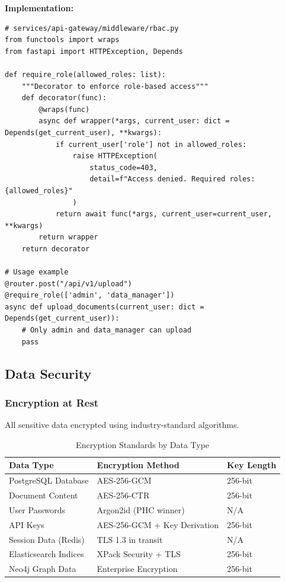 \textbf{Implementation:}
\begin{lstlisting}[style=pythonstyle]
# services/api-gateway/middleware/rbac.py
from functools import wraps
from fastapi import HTTPException, Depends

def require_role(allowed_roles: list):
    """Decorator to enforce role-based access"""
    def decorator(func):
        @wraps(func)
        async def wrapper(*args, current_user: dict = Depends(get_current_user), **kwargs):
            if current_user['role'] not in allowed_roles:
                raise HTTPException(
                    status_code=403,
                    detail=f"Access denied. Required roles: {allowed_roles}"
                )
            return await func(*args, current_user=current_user, **kwargs)
        return wrapper
    return decorator

# Usage example
@router.post("/api/v1/upload")
@require_role(['admin', 'data_manager'])
async def upload_documents(current_user: dict = Depends(get_current_user)):
    # Only admin and data_manager can upload
    pass
\end{lstlisting}

\subsection{Data Security}

\subsubsection{Encryption at Rest}

All sensitive data encrypted using industry-standard algorithms.

\begin{table}[h]
\centering
\caption{Encryption Standards by Data Type}
\begin{tabularx}{\textwidth}{lXl}
\toprule
\textbf{Data Type} & \textbf{Encryption Method} & \textbf{Key Length} \\
\midrule
PostgreSQL Database & AES-256-GCM & 256-bit \\
Document Content & AES-256-CTR & 256-bit \\
User Passwords & Argon2id (PHC winner) & N/A \\
API Keys & AES-256-GCM + Key Derivation & 256-bit \\
Session Data (Redis) & TLS 1.3 in transit & N/A \\
Elasticsearch Indices & XPack Security + TLS & 256-bit \\
Neo4j Graph Data & Enterprise Encryption & 256-bit \\
\bottomrule
\end{tabularx}
\end{table}

